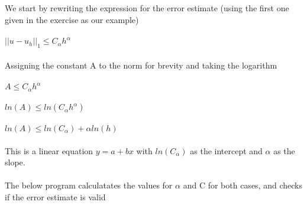 \documentclass[a4paper,english,12pt,twoside]{article}
\begin{document}
We start by rewriting the expression for the error estimate (using the first one given in the exercise as our example)\\
\\
$||u-u_h||_1 \leq C_{\alpha} h^{\alpha}$\\
\\
Assigning the constant A to the norm for brevity and taking the logarithm\\
\\
$A \leq C_{\alpha}h^{\alpha}$\\
\\
$ln(A) \leq ln(C_{\alpha}h^{\alpha})$\\
\\
$ln(A) \leq ln(C_{\alpha}) + \alpha ln(h)$\\
\\
This is a linear equation $y = a + bx$ with $ln(C_{\alpha})$ as the intercept and $\alpha$ as the slope.\\
\\
The below program calculatates the values for $\alpha$ and C for both cases, and checks if the error estimate is valid\\
\\
\end{document}
